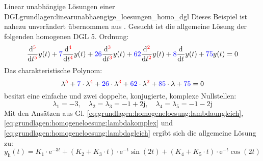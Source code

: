\begin{frame}
{    \begin{bsp}{Linear unabhängige Lösungen einer DGL}{grundlagen:linearunabhaengige_loesungen_homo_dgl}
        Dieses Beispiel ist nahezu unverändert übernommen aus \cite[S. 241]{albach}. 
        Gesucht ist die allgemeine Lösung der folgenden homogenen DGL 5. Ordnung:
        \begin{equation*}
            \dt[\ecr{5}] y(t) + \ecb{7} \dt[\ecr{4}] y(t) + \ecb{26} \dt[\ecr{3}] y(t) + \ecb{62} \dt[\ecr{2}] y(t) + \ecb{8} \dt y(t) + \ecb{75} y(t) = 0
        \end{equation*}
        Das charakteristische Polynom:
        \begin{equation*}
            \lambda^{\ecr{5}} + \ecb{7} \cdot \lambda^{\ecr{4}} + \ecb{26} \cdot \lambda^{\ecr{3}} + \ecb{62} \cdot \lambda^{\ecr{2}} + \ecb{85} \cdot \lambda + \ecb{75} = 0
        \end{equation*}
        besitzt eine einfache und zwei doppelte, konjugierte, komplexe Nullstellen:
        \begin{equation*}
            \lambda_1 = -3, \quad \lambda_2 = \lambda_3 = -1+\mathrm{2j}, \quad \lambda_4 = \lambda_5 = -1-\mathrm{2j}
        \end{equation*}
        Mit den Ansätzen aus Gl. \ref{eq:grundlagen:homogeneloesung:lambdaungleich}, \ref{eq:grundlagen:homogeneloesung:lambdakomplex} und
        \ref{eq:grundlagen:homogeneloesung:lambdagleich} ergibt sich die allgemeine Lösung zu:
        \begin{equation*}
            y_{\mathrm{h}}(t) = K_1 \cdot \mathrm{e}^{-3 t} + (K_2 + K_3 \cdot t) \cdot \mathrm{e}^{-t} \sin(2t) + (K_4 + K_5 \cdot t) \cdot \mathrm{e}^{-t} \cos(2t)
        \end{equation*}
    \end{bsp}
}%
\end{frame}

